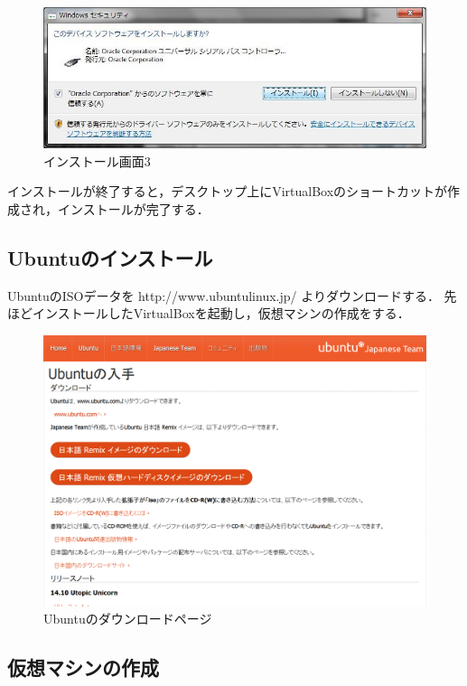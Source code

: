 \begin{figure}[H]
\centering
\includegraphics[width=15cm]{virtualbox004.png}
\caption{インストール画面3}\label{virtualboxインストール画面3}
\end{figure}
インストールが終了すると，デスクトップ上にVirtualBoxのショートカットが作成され，インストールが完了する．


\clearpage


\subsection{Ubuntuのインストール}

UbuntuのISOデータを http://www.ubuntulinux.jp/ よりダウンロードする．
先ほどインストールしたVirtualBoxを起動し，仮想マシンの作成をする．

\begin{figure}[H]
\centering
\includegraphics[width=15cm]{ubuntuiso.png}
\caption{Ubuntuのダウンロードページ}\label{Ubuntuのダウンロードページ}
\end{figure}

\subsection{仮想マシンの作成}

